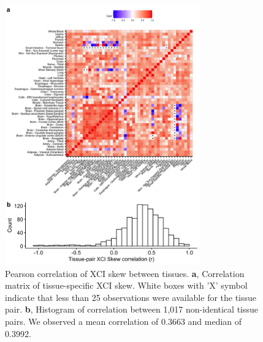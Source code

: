 \begin{figure}[ht!]
    \centering
    \includegraphics[width=0.75\textwidth]{chapter4/Figures/Supplementary_Figure_2.png}
    \caption{
        Pearson correlation of XCI skew between tissues.
        \textbf{a}, Correlation matrix of tissue-specific XCI skew. White boxes with 'X' symbol indicate that less than 25 observations were available for the tissue pair.
        \textbf{b}, Histogram of correlation between 1,017 non-identical tissue pairs. We observed a mean correlation of 0.3663 and median of 0.3992.
    }
    \label{fig:supp_fig4.2}
\end{figure}